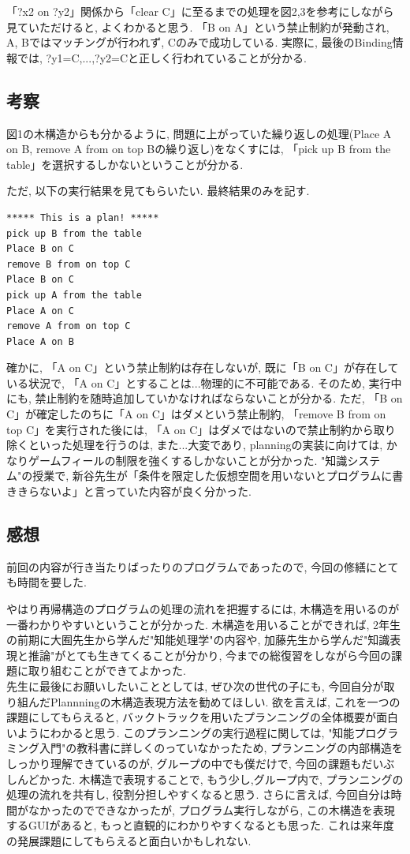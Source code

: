 \documentclass[uplatex,12pt]{jsarticle}
\begin{document}
「?x2 on ?y2」関係から「clear C」に至るまでの処理を図2,3を参考にしながら見ていただけると, よくわかると思う. 「B on A」という禁止制約が発動され, A, Bではマッチングが行われず, Cのみで成功している. 実際に, 最後のBinding情報では, {?y1=C,...,?y2=C}と正しく行われていることが分かる.

\subsection{考察}
図1の木構造からも分かるように, 問題に上がっていた繰り返しの処理(Place A on B, remove A from on top Bの繰り返し)をなくすには, 「pick up B from the table」を選択するしかないということが分かる.

ただ, 以下の実行結果を見てもらいたい. 最終結果のみを記す.
\begin{lstlisting}[caption=A on Cが生じてしまう, label=src:No1]
***** This is a plan! *****
pick up B from the table
Place B on C
remove B from on top C
Place B on C
pick up A from the table
Place A on C
remove A from on top C
Place A on B
\end{lstlisting}


確かに, 「A on C」という禁止制約は存在しないが, 既に「B on C」が存在している状況で, 「A on C」とすることは...物理的に不可能である. そのため, 実行中にも, 禁止制約を随時追加していかなければならないことが分かる. ただ, 「B on C」が確定したのちに「A on C」はダメという禁止制約, 「remove B from on top C」を実行された後には, 「A on C」はダメではないので禁止制約から取り除くといった処理を行うのは, また...大変であり, planningの実装に向けては, かなりゲームフィールの制限を強くするしかないことが分かった. "知識システム"の授業で, 新谷先生が「条件を限定した仮想空間を用いないとプログラムに書ききらないよ」と言っていた内容が良く分かった.



\subsection{感想}
前回の内容が行き当たりばったりのプログラムであったので, 今回の修繕にとても時間を要した. 

やはり再帰構造のプログラムの処理の流れを把握するには, 木構造を用いるのが一番わかりやすいということが分かった. 木構造を用いることができれば, 2年生の前期に大囿先生から学んだ"知能処理学"の内容や, 加藤先生から学んだ"知識表現と推論"がとても生きてくることが分かり, 今までの総復習をしながら今回の課題に取り組むことができてよかった. \\
先生に最後にお願いしたいこととしては, ぜひ次の世代の子にも, 今回自分が取り組んだPlannningの木構造表現方法を勧めてほしい. 欲を言えば, これを一つの課題にしてもらえると, バックトラックを用いたプランニングの全体概要が面白いようにわかると思う. このプランニングの実行過程に関しては, "知能プログラミング入門"の教科書に詳しくのっていなかったため, プランニングの内部構造をしっかり理解できているのが, グループの中でも僕だけで, 今回の課題もだいぶしんどかった. 木構造で表現することで, もう少し,グループ内で, プランニングの処理の流れを共有し, 役割分担しやすくなると思う. さらに言えば, 今回自分は時間がなかったのでできなかったが, プログラム実行しながら, この木構造を表現するGUIがあると, もっと直観的にわかりやすくなるとも思った. これは来年度の発展課題にしてもらえると面白いかもしれない.
\end{document}

